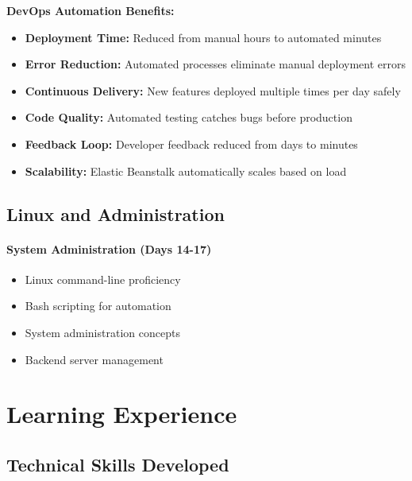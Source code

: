 \textbf{DevOps Automation Benefits:}
\begin{itemize}
    \item \textbf{Deployment Time:} Reduced from manual hours to automated minutes  
    \item \textbf{Error Reduction:} Automated processes eliminate manual deployment errors
    \item \textbf{Continuous Delivery:} New features deployed multiple times per day safely
    \item \textbf{Code Quality:} Automated testing catches bugs before production
    \item \textbf{Feedback Loop:} Developer feedback reduced from days to minutes
    \item \textbf{Scalability:} Elastic Beanstalk automatically scales based on load
\end{itemize}

\subsection{Linux and Administration}

\paragraph{System Administration (Days 14-17)}

\begin{itemize}
    \item Linux command-line proficiency
    \item Bash scripting for automation
    \item System administration concepts
    \item Backend server management
\end{itemize}


\section{Learning Experience}

\subsection{Technical Skills Developed}

